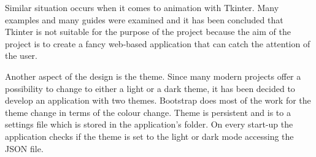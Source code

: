 \documentclass[12pt]{report}
\begin{document}
Similar situation occurs when it comes to animation with Tkinter. Many examples and many guides were examined and 
it has been concluded that Tkinter is not suitable for the purpose of the project because the aim of the project
is to create a fancy web-based application that can catch the attention of the user.

\clearpage

Another aspect of the design is the theme. Since many modern projects offer a possibility to change to 
either a light or a dark theme, it has been decided to develop an application with two themes. Bootstrap 
does most of the work for the theme change in terms of the colour change. Theme is persistent and is to a
settings file which is stored in the application's folder. On every start-up the application checks if the
theme is set to the light or dark mode accessing the JSON file.
\end{document}
